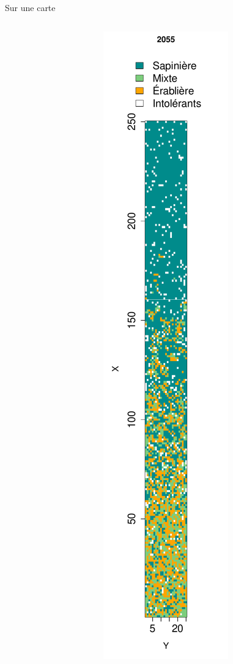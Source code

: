 \documentclass{eecslides}
\begin{document}
\begin{frame}{Sur une carte}
\begin{columns}
\begin{column}{0.25\textwidth}
\begin{center}
				\end{center}	
			\end{column}
			\begin{column}{0.25\textwidth}
				\begin{center}
					\includegraphics[height=0.8\textheight]{largeplot_2055}

\end{center}
\end{column}
\end{columns}
\end{frame}
\end{document}

